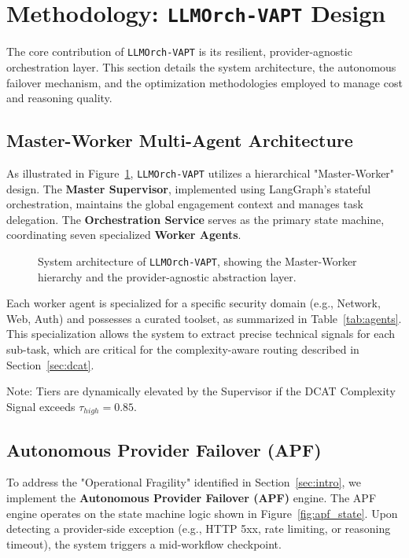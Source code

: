 \section{Methodology: \texttt{LLMOrch-VAPT} Design}
\label{sec:methodology}

The core contribution of \texttt{LLMOrch-VAPT} is its resilient, provider-agnostic orchestration layer. This section details the system architecture, the autonomous failover mechanism, and the optimization methodologies employed to manage cost and reasoning quality.

\subsection{Master-Worker Multi-Agent Architecture}
As illustrated in Figure~\ref{fig:architecture}, \texttt{LLMOrch-VAPT} utilizes a hierarchical "Master-Worker" design. The \textbf{Master Supervisor}, implemented using LangGraph's stateful orchestration, maintains the global engagement context and manages task delegation. The \textbf{Orchestration Service} serves as the primary state machine, coordinating seven specialized \textbf{Worker Agents}.

\begin{figure}[!t]
    \centering
    \resizebox{0.7\textwidth}{!}{
        
    }
    \caption{System architecture of \texttt{LLMOrch-VAPT}, showing the Master-Worker hierarchy and the provider-agnostic abstraction layer.}
    \label{fig:architecture}
\end{figure}

Each worker agent is specialized for a specific security domain (e.g., Network, Web, Auth) and possesses a curated toolset, as summarized in Table~\ref{tab:agents}. This specialization allows the system to extract precise technical signals for each sub-task, which are critical for the complexity-aware routing described in Section~\ref{sec:dcat}.

\begin{table}[!t]
    \centering
    \caption{Specialized Worker Agent Roles and Resource Allocation}
    \label{tab:agents}
    \resizebox{0.8\textwidth}{!}{
        
    }
    \vspace{1mm}
    \footnotesize{Note: Tiers are dynamically elevated by the Supervisor if the DCAT Complexity Signal exceeds $\tau_{high} = 0.85$.}
\end{table}

\subsection{Autonomous Provider Failover (APF)}
\label{sec:apf}
To address the "Operational Fragility" identified in Section~\ref{sec:intro}, we implement the \textbf{Autonomous Provider Failover (APF)} engine. The APF engine operates on the state machine logic shown in Figure~\ref{fig:apf_state}. Upon detecting a provider-side exception (e.g., HTTP 5xx, rate limiting, or reasoning timeout), the system triggers a mid-workflow checkpoint.

